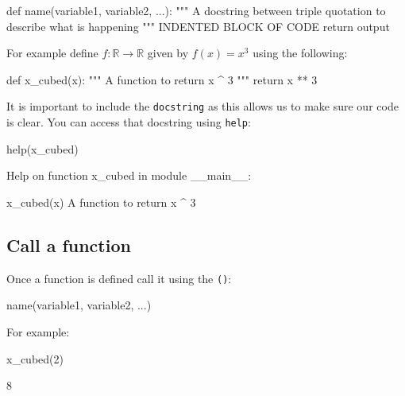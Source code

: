 \begin{api}
def name(variable1, variable2, ...):
    """
    A docstring between triple quotation to describe what is happening
    """
    INDENTED BLOCK OF CODE
    return output
\end{api}

For example define \(f:\mathbb{R}\to\mathbb{R}\) given by \(f(x) = x ^
3\) using the following:




\begin{pyin}
def x_cubed(x):
    """
    A function to return x ^ 3
    """
    return x ** 3
\end{pyin}

It is important to include the \texttt{docstring} as this allows us to make sure our
code is clear. You can access that docstring using \texttt{help}:

\begin{pyin}
help(x_cubed)
\end{pyin}





\begin{raw}
Help on function x_cubed in module __main__:

x_cubed(x)
    A function to return x ^ 3
\end{raw}





\subsection{Call a function}
\label{\detokenize{tools-for-mathematics/06-probability/how/main:call-a-function}}

Once a function is defined call it using the \texttt{()}:


\begin{api}
name(variable1, variable2, ...)
\end{api}



For example:




\begin{pyin}
x_cubed(2)
\end{pyin}





\begin{raw}
8
\end{raw}







